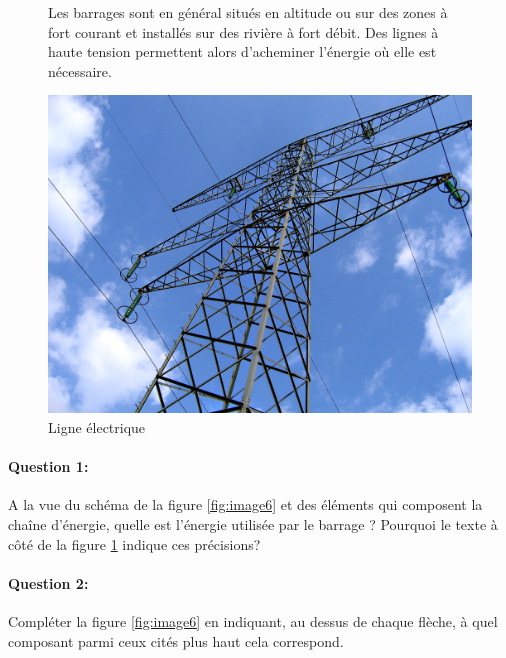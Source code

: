 \begin{figure}[htbp]
\begin{minipage}[c]{.55\linewidth}
Les barrages sont en général situés en altitude ou sur des zones à fort courant et installés sur des rivière à fort débit. Des lignes à haute tension permettent alors d'acheminer l'énergie où elle est nécessaire.
\end{minipage}
\hfill
\begin{minipage}[c]{.4\linewidth}
\begin{center}
 \includegraphics[width=0.9\linewidth]{img/ligne.jpg}
\caption{Ligne électrique}
\label{fig:image5}
\end{center}
\end{minipage}
\end{figure}

\paragraph{Question 1:}

A la vue du schéma de la figure \ref{fig:image6} et des éléments qui composent la chaîne d'énergie, quelle est l'énergie utilisée par le barrage ? Pourquoi le texte à côté de la figure \ref{fig:image5} indique ces précisions?

\paragraph{Question 2:}

Compléter la figure \ref{fig:image6} en indiquant, au dessus de chaque flèche, à quel composant parmi ceux cités plus haut cela correspond.

